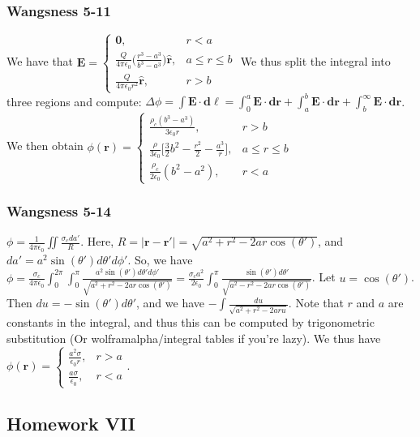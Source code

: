 \documentclass[oneside]{book}
\theoremstyle{definition}
\newcommand*\B[1]{\mathbf{#1}}
\newcommand*\Bh[1]{\mathbf{\hat{#1}}}
\begin{document}
\subsubsection{Wangsness 5-11}

We have that $\B{E} = \begin{cases} \B{0}, & r<a\\ \frac{Q}{4\pi \epsilon_0}\bigg(\frac{r^3-a^3}{b^3-a^3}\bigg)\Bh{r}, & a\leq r \leq b\\ \frac{Q}{4\pi \epsilon_0 r^2}\Bh{r}, & r>b\end{cases}$ We thus split the integral into three regions and compute: $\Delta\phi=\int \B{E}\cdot \B{d\ell} = \int_{0}^{a} \B{E}\cdot \B{dr}+\int_{a}^{b} \B{E}\cdot \B{dr}+\int_{b}^{\infty} \B{E}\cdot \B{dr}$. We then obtain $\phi(\B{r}) = \begin{cases} \frac{\rho_c(b^3-a^3)}{3\epsilon_0 r}, & r>b \\ \frac{\rho}{3\epsilon_0}\bigg[ \frac{3}{2}b^2-\frac{r^2}{2}-\frac{a^3}{r}\bigg], & a\leq r \leq b\\ \frac{\rho_c}{2\epsilon_0}(b^2-a^2), & r<a\end{cases}$

\subsubsection{Wangsness 5-14}

$\phi = \frac{1}{4\pi \epsilon_0}\iint \frac{\sigma_c da'}{R}$. Here, $R = |\B{r}-\B{r}'| = \sqrt{a^2+r^2-2ar\cos(\theta')}$, and $da' = a^2\sin(\theta')d\theta'd\phi'$. So, we have $\phi = \frac{\sigma_c}{4\pi \epsilon_0}\int_{0}^{2\pi}\int_{0}^{\pi} \frac{a^2\sin(\theta')d\theta' d\phi'}{\sqrt{a^2+r^2-2ar\cos(\theta')}} = \frac{\sigma_c a^2}{2\epsilon_0}\int_{0}^{\pi} \frac{\sin(\theta')d\theta'}{\sqrt{a^2-r^2-2ar\cos(\theta')}}$. Let $u = \cos(\theta')$. Then $du = -\sin(\theta')d\theta'$, and we have $-\int\frac{du}{\sqrt{a^2+r^2-2aru}}$. Note that $r$ and $a$ are constants in the integral, and thus this can be computed by trigonometric substitution (Or wolframalpha/integral tables if you're lazy). We thus have $\phi(\B{r}) = \begin{cases}\frac{a^2\sigma}{\epsilon_0 r}, & r>a \\ \frac{a\sigma}{\epsilon_0}, & r<a\end{cases}$.


\subsection*{Homework VII}
\end{document}

